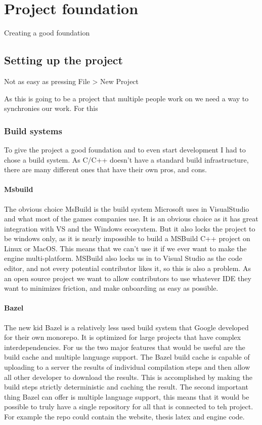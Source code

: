 \chapter{Project foundation}

Creating a good foundation

\section{Setting up the project}

Not as easy as pressing File > New Project

As this is going to be a project that multiple people work on we need a way to synchronies our work. For this

\subsection{Build systems}

To give the project a good foundation and to even start development I had to chose a build system. As C/C++ doesn't have a standard build infrastructure, there are many different ones that have their own pros, and cons.

\subsubsection{Msbuild}
The obvious choice
MsBuild is the build system Microsoft uses in VisualStudio and what most of the games companies use.
It is an obvious choice as it has great integration with VS and the Windows ecosystem.
But it also locks the project to be windows only, as it is nearly impossible to build a MSBuild C++ project on Linux or MacOS.
This means that we can't use it if we ever want to make the engine multi-platform.
MSBuild also locks us in to Visual Studio as the code editor, and not every potential contributor likes it, so this is also a problem.
As an open source project we want to allow contributors to use whatever IDE they want to minimizes friction, and make onboarding as easy as possible.

\subsubsection{Bazel}
The new kid
Bazel is a relatively less used build system that Google developed for their own monorepo.
It is optimized for large projects that have complex interdependencies.
For us the two major features that would be useful are the build cache and multiple language support.
The Bazel build cache is capable of uploading to a server the results of individual compilation steps and then allow all other developer to download the results.
This is accomplished by making the build steps strictly deterministic and caching the result.
The second important thing Bazel can offer is multiple language support,
this means that it would be possible to truly have a single repository for all that is connected to teh project.
For example the repo could contain the website, thesis latex and engine code.

